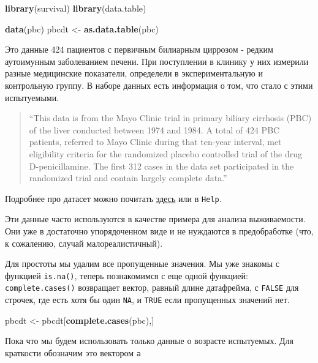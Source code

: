 \documentclass[]{book}
\newenvironment{Shaded}{\begin{snugshade}}{\end{snugshade}}
\newcommand{\KeywordTok}[1]{\textcolor[rgb]{0.13,0.29,0.53}{\textbf{#1}}}
\newcommand{\StringTok}[1]{\textcolor[rgb]{0.31,0.60,0.02}{#1}}
\newcommand{\NormalTok}[1]{#1}
\begin{document}
\begin{Shaded}
\begin{Highlighting}[]
\KeywordTok{library}\NormalTok{(survival)}
\KeywordTok{library}\NormalTok{(data.table)}

\KeywordTok{data}\NormalTok{(pbc)}
\NormalTok{pbcdt <-}\StringTok{ }\KeywordTok{as.data.table}\NormalTok{(pbc)}
\end{Highlighting}
\end{Shaded}

Это данные 424 пациентов с первичным билиарным циррозом - редким
аутоимунным заболеванием печени. При поступлении в клинику у них
измерили разные медицинские показатели, определели в экспериментальную и
контрольную группу. В наборе данных есть информация о том, что стало с
этими испытуемыми.

\begin{quote}
``This data is from the Mayo Clinic trial in primary biliary cirrhosis
(PBC) of the liver conducted between 1974 and 1984. A total of 424 PBC
patients, referred to Mayo Clinic during that ten-year interval, met
eligibility criteria for the randomized placebo controlled trial of the
drug D-penicillamine. The first 312 cases in the data set participated
in the randomized trial and contain largely complete data.''
\end{quote}

Подробнее про датасет можно почитать
\href{https://stat.ethz.ch/R-manual/R-devel/RHOME/library/survival/html/pbc.html}{здесь}
или в \texttt{Help}.

Эти данные часто используются в качестве примера для анализа
выживаемости. Они уже в достаточно упорядоченном виде и не нуждаются в
предобработке (что, к сожалению, случай малореалистичный).

Для простоты мы удалим все пропущенные значения. Мы уже знакомы с
функцией \texttt{is.na()}, теперь познакомимся с еще одной функцией:
\texttt{complete.cases()} возвращает вектор, равный длине датафрейма, с
\texttt{FALSE} для строчек, где есть хотя бы один \texttt{NA}, и
\texttt{TRUE} если пропущенных значений нет.

\begin{Shaded}
\begin{Highlighting}[]
\NormalTok{pbcdt <-}\StringTok{ }\NormalTok{pbcdt[}\KeywordTok{complete.cases}\NormalTok{(pbc),]}
\end{Highlighting}
\end{Shaded}

Пока что мы будем использовать только данные о возрасте испытуемых. Для
краткости обозначим это вектором \texttt{a}
\end{document}
